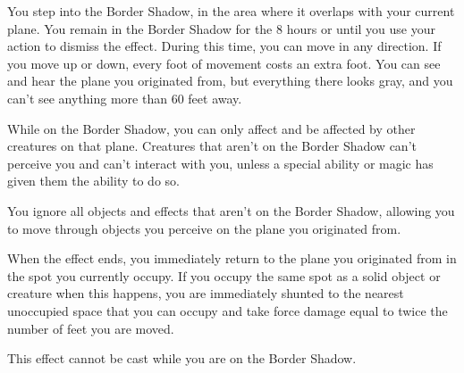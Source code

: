 You step into the Border Shadow, in the area where it overlaps with your current plane. You remain in the Border Shadow for the 8 hours or until you use your action to dismiss the effect. During this time, you can move in any direction. If you move up or down, every foot of movement costs an extra foot. You can see and hear the plane you originated from, but everything there looks gray, and you can’t see anything more than 60 feet away.

While on the  Border Shadow, you can only affect and be affected by other creatures on that plane. Creatures that aren’t on the Border Shadow can’t perceive you and can’t interact with you, unless a special ability or magic has given them the ability to do so.

You ignore all objects and effects that aren’t on the Border Shadow, allowing you to move through objects you perceive on the plane you originated from.

When the effect ends, you immediately return to the plane you originated from in the spot you currently occupy. If you occupy the same spot as a solid object or creature when this happens, you are immediately shunted to the nearest unoccupied space that you can occupy and take force damage equal to twice the number of feet you are moved.

This effect cannot be cast while you are on the Border Shadow.









